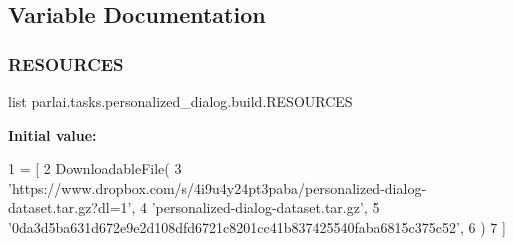 \subsection{Variable Documentation}
\mbox{\label{namespaceparlai_1_1tasks_1_1personalized__dialog_1_1build_abc1c81a7a5fdba4b1ea9c6bfecaa9300}} 
\subsubsection{\texorpdfstring{R\+E\+S\+O\+U\+R\+C\+ES}{RESOURCES}}
{\footnotesize\ttfamily list parlai.\+tasks.\+personalized\+\_\+dialog.\+build.\+R\+E\+S\+O\+U\+R\+C\+ES}

{\bfseries Initial value\+:}
\begin{DoxyCode}
1 =  [
2     DownloadableFile(
3         \textcolor{stringliteral}{'https://www.dropbox.com/s/4i9u4y24pt3paba/personalized-dialog-dataset.tar.gz?dl=1'},
4         \textcolor{stringliteral}{'personalized-dialog-dataset.tar.gz'},
5         \textcolor{stringliteral}{'0da3d5ba631d672e9e2d108dfd6721c8201cc41b837425540faba6815c375c52'},
6     )
7 ]
\end{DoxyCode}
